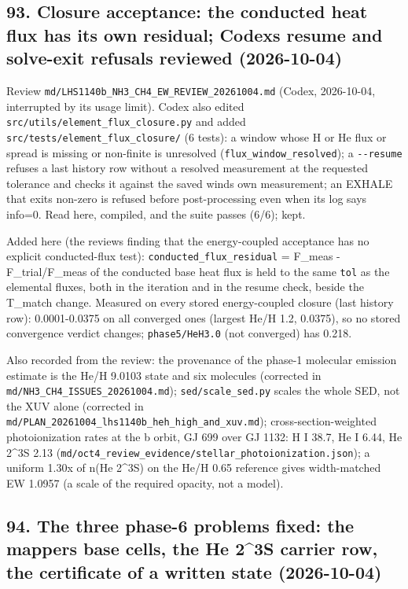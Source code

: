 \documentclass[english,a4paper]{my_memo}
\begin{document}
\subsection{93. Closure acceptance: the conducted heat flux has its own residual; Codex\textquotesingle s resume and solve-exit refusals reviewed (2026-10-04)}\label{93-closure-acceptance-the-conducted-heat-flux-has-its-own-residual-codexs-resume-and-solve-exit-refusals-reviewed-2026-10-04}

Review \texttt{md/LHS1140b\_NH3\_CH4\_EW\_REVIEW\_20261004.md} (Codex, 2026-10-04,
interrupted by its usage limit). Codex also edited
\texttt{src/utils/element\_flux\_closure.py} and added
\texttt{src/tests/element\_flux\_closure/} (6 tests): a window whose H or He flux or
spread is missing or non-finite is unresolved (\texttt{flux\_window\_resolved}); a
\texttt{-\/-resume} refuses a last history row without a resolved measurement at the
requested tolerance and checks it against the saved wind\textquotesingle s own measurement;
an EXHALE that exits non-zero is refused before post-processing even when
its log says info=0. Read here, compiled, and the suite passes (6/6); kept.

Added here (the review\textquotesingle s finding that the energy-coupled acceptance has no
explicit conducted-flux test): \texttt{conducted\_flux\_residual} =
\textbar F\_meas - F\_trial\textbar/\textbar F\_meas\textbar{} of the conducted base heat flux is held to the
same \texttt{tol} as the elemental fluxes, both in the iteration and in the
resume check, beside the T\_match change. Measured on every stored
energy-coupled closure (last history row): 0.0001-0.0375 on all converged
ones (largest He/H 1.2, 0.0375), so no stored convergence verdict changes;
\texttt{phase5/HeH3.0} (not converged) has 0.218.

Also recorded from the review: the provenance of the phase-1 molecular
emission estimate is the He/H 9.0103 state and six molecules (corrected in
\texttt{md/NH3\_CH4\_ISSUES\_20261004.md}); \texttt{sed/scale\_sed.py} scales the whole SED,
not the XUV alone (corrected in \texttt{md/PLAN\_20261004\_lhs1140b\_heh\_high\_and\_xuv.md});
cross-section-weighted photoionization rates at the b orbit, GJ 699 over
GJ 1132: H I 38.7, He I 6.44, He 2\^{}3S 2.13
(\texttt{md/oct4\_review\_evidence/stellar\_photoionization.json}); a uniform 1.30x
of n(He 2\^{}3S) on the He/H 0.65 reference gives width-matched EW 1.0957
(a scale of the required opacity, not a model).

\subsection{94. The three phase-6 problems fixed: the mapper\textquotesingle s base cells, the He 2\^{}3S carrier row, the certificate of a written state (2026-10-04)}\label{94-the-three-phase-6-problems-fixed-the-mappers-base-cells-the-he-23s-carrier-row-the-certificate-of-a-written-state-2026-10-04}
\end{document}
